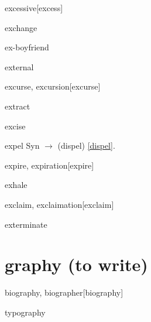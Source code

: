 \begin{RefWord}{excessive}[excess]
\end{RefWord}

\begin{RefWord}{exchange}
\end{RefWord}

\begin{RefWord}{ex-boyfriend}
\end{RefWord}

\begin{RefWord}{external}
\end{RefWord}

\begin{RefWord}{excurse, excursion}[excurse]
\end{RefWord}

\begin{RefWord}{extract}
\end{RefWord}

\begin{RefWord}{excise}
\end{RefWord}

\begin{RefWord}{expel}
    Syn $\rightarrow$ (dispel) \ref{dispel}.
\end{RefWord}

\begin{RefWord}{expire, expiration}[expire]
\end{RefWord}

\begin{RefWord}{exhale}
\end{RefWord}

\begin{RefWord}{exclaim, exclaimation}[exclaim]
\end{RefWord}

\begin{RefWord}{exterminate}
\end{RefWord}

\section{graphy (to write)}

\begin{RefWord}{biography, biographer}[biography]
\end{RefWord}

\begin{RefWord}{typography}
\end{RefWord}

